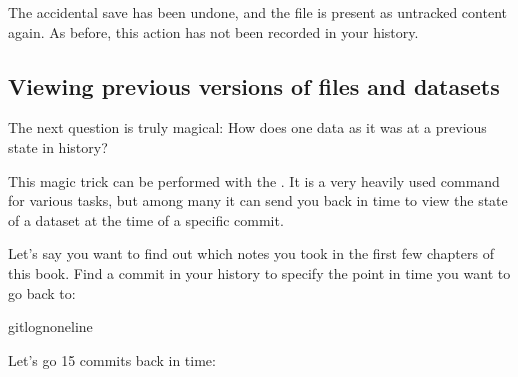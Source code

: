 \sphinxAtStartPar
The accidental save has been undone, and the file is present
as untracked content again.
As before, this action has not been recorded in your history.


\subsection{Viewing previous versions of files and datasets}
\label{\detokenize{basics/101-137-history:viewing-previous-versions-of-files-and-datasets}}
\sphinxAtStartPar
The next question is truly magical: How does one 
data as it was at a previous state in history?

\sphinxAtStartPar
This magic trick can be performed with the .
It is a very heavily used command for various tasks, but among
many it can send you back in time to view the state of a dataset
at the time of a specific commit.

\sphinxAtStartPar
Let’s say you want to find out which notes you took in the first
few chapters of this book. Find a commit {\hyperref[\detokenize{glossary:term-shasum}]{}} in your history
to specify the point in time you want to go back to:

\begin{sphinxVerbatim}[commandchars=\\\{\}]
gitlog\PYGZhy{}n\PYGZhy{}\PYGZhy{}oneline
\end{sphinxVerbatim}

\sphinxAtStartPar
Let’s go 15 commits back in time:

